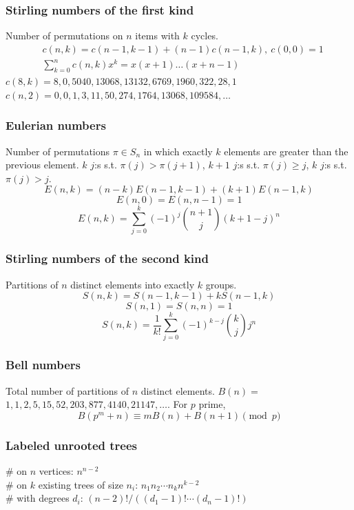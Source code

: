 \begin{multicols}{\Columns}
	\subsubsection{Stirling numbers of the first kind}
		Number of permutations on $n$ items with $k$ cycles.
		\begin{align*}
			&c(n,k) = c(n-1,k-1) + (n-1) c(n-1,k),\ c(0,0) = 1 \\
			&\textstyle \sum_{k=0}^n c(n,k)x^k = x(x+1) \dots (x+n-1)
		\end{align*}
		$c(8,k) = 8, 0, 5040, 13068, 13132, 6769, 1960, 322, 28, 1$ \\
		$c(n,2) = 0, 0, 1, 3, 11, 50, 274, 1764, 13068, 109584, \dots$

	\subsubsection{Eulerian numbers}
		Number of permutations $\pi \in S_n$ in which exactly $k$ elements are greater than the previous element. $k$ $j$:s s.t. $\pi(j)>\pi(j+1)$, $k+1$ $j$:s s.t. $\pi(j)\geq j$, $k$ $j$:s s.t. $\pi(j)>j$.
		$$E(n,k) = (n-k)E(n-1,k-1) + (k+1)E(n-1,k)$$
		$$E(n,0) = E(n,n-1) = 1$$
		$$E(n,k) = \sum_{j=0}^k(-1)^j\binom{n+1}{j}(k+1-j)^n$$

	\subsubsection{Stirling numbers of the second kind}
		Partitions of $n$ distinct elements into exactly $k$ groups.
		$$S(n,k) = S(n-1,k-1) + k S(n-1,k)$$
		$$S(n,1) = S(n,n) = 1$$
		$$S(n,k) = \frac{1}{k!}\sum_{j=0}^k (-1)^{k-j}\binom{k}{j}j^n$$

	\subsubsection{Bell numbers}
		Total number of partitions of $n$ distinct elements. $B(n) =$
		$1, 1, 2, 5, 15, 52, 203, 877, 4140, 21147, \dots$. For $p$ prime,
		\[ B(p^m+n)\equiv mB(n)+B(n+1) \pmod{p} \]

	\subsubsection{Labeled unrooted trees}
		\# on $n$ vertices: $n^{n-2}$ \\
		\# on $k$ existing trees of size $n_i$: $n_1n_2\cdots n_k n^{k-2}$ \\
		\# with degrees $d_i$: $(n-2)! / ((d_1-1)! \cdots (d_n-1)!)$


\end{multicols}
